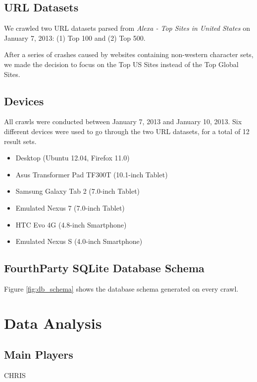 \documentclass{acm_proc_article-sp}
\begin{document}
\subsection{URL Datasets}

We crawled two URL datasets parsed from \emph{Alexa - Top Sites in United States} on January 7, 2013: (1) Top 100 and (2) Top 500.

After a series of crashes caused by websites containing non-western character sets, we made the decision to focus on the Top US Sites instead of the Top Global Sites.

\subsection{Devices}

All crawls were conducted between January 7, 2013 and January 10, 2013. Six different devices were used to go through the two URL datasets, for a total of 12 result sets.

\begin{itemize}
\item Desktop (Ubuntu 12.04, Firefox 11.0)

\item Asus Transformer Pad TF300T (10.1-inch Tablet)

\item Samsung Galaxy Tab 2 (7.0-inch Tablet)

\item Emulated Nexus 7 (7.0-inch Tablet)

\item HTC Evo 4G (4.8-inch Smartphone)

\item Emulated Nexus S (4.0-inch Smartphone)
\end{itemize}

\subsection{FourthParty SQLite Database Schema}
Figure \ref{fig:db_schema} shows the database schema generated on every crawl.

\section{Data Analysis}

\subsection{Main Players}
CHRIS
\end{document}
